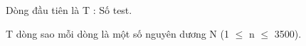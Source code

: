 Dòng đầu tiên là T : Số test.

T dòng sao mỗi dòng là một số nguyên dương N (1 $\le$ n  $\le$ 3500).

\